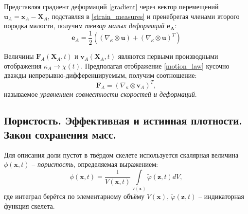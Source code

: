 	Представляя градиент деформаций \eqref{gradient} через вектор перемещений $\mathbf{u}_A = \mathbf{x}_A - \mathbf{X}_A$, подставляя в \eqref{strain_measures} и пренебрегая членами второго порядка малости, получим \textit{тензор малых деформаций} $\mathbf{e_A}$:
\begin{equation}
	\label{small_strains}
	\mathbf{e}_A = \frac{1}{2}\left(\left(\nabla_{\kappa} \otimes \mathbf{u}\right) + \left(\nabla_{\kappa}\otimes \mathbf{u}\right)^T\right)
\end{equation}

	Величины $\mathbf{F}_A(\mathbf{X}_A, t)$ и $\mathbf{v}_A(\mathbf{X}_A, t)$ являются первыми производными отображения $\kappa_A \to \chi(t)$. Предполагая отображение \eqref{motion_law} кусочно дважды непрерывно-дифференцируемым, получим соотношение:
\begin{equation}
	\label{velocities_strains}
	\dot{\mathbf{F}}_A = \left(\nabla_{\kappa} \otimes \mathbf{v}_A \right)^T,
\end{equation}
	называемое \textit{уравнением совместности скоростей и деформаций}.

\subsection{Пористость. Эффективная и истинная плотности. Закон сохранения масс.}

	Для описания доли пустот в твёрдом скелете используется скалярная величина $\phi(\mathbf{x}, t)$ -- \textit{пористость}, определяемая выражением:
\begin{equation}
	\label{porosity}
	\phi(\mathbf{x}, t) = \frac{1}{V(\mathbf{x}, t)}\int\limits_{V(\mathbf{x})}\tilde{\varphi}(\mathbf{z}, t) dV,
\end{equation}
	где интеграл берётся по элементарному объёму $V(\mathbf{x})$, $\tilde{\varphi}(\mathbf{z}, t)$ -- индикаторная функция скелета.